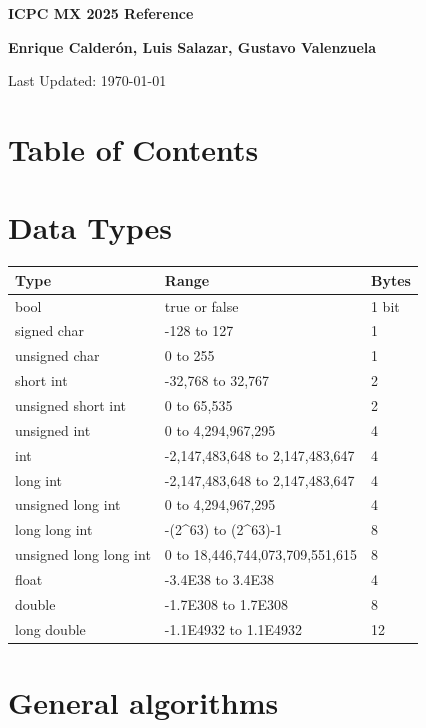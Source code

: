 \documentclass[10pt]{article}
\newcommand{\authorname}{\textbf{Enrique Calderón, Luis Salazar, Gustavo Valenzuela}}
\newcommand{\maketitlepage}{
    \begin{titlepage}
        \centering
        \vspace*{2cm}
        {\Huge\bfseries ICPC MX 2025 Reference\par}
        \vspace{1cm}
        {\Large \authorname \par}
        \vspace{2cm}
        {\large Last Updated: \today\par}
        \vfill
    \end{titlepage}
}
\begin{document}
\maketitlepage
\cleardoublepage

\section*{Table of Contents}
\begin{multicols*}{2}
    \startcontents[sections]
\end{multicols*}
\newpage

\begin{multicols*}{2}

\section{Data Types}
\begin{tabularx}{\linewidth}{|l|X|l|}
    \hline
    \textbf{Type} & \textbf{Range} & \textbf{Bytes} \\
    \hline
    bool & true or false & 1 bit \\
    \hline
    signed char & -128 to 127 & 1 \\
    \hline
    unsigned char & 0 to 255 & 1 \\
    \hline
    short int & -32,768 to 32,767 & 2 \\
    \hline
    unsigned short int & 0 to 65,535 & 2 \\
    \hline
    unsigned int & 0 to 4,294,967,295 & 4 \\
    \hline
    int & -2,147,483,648 to 2,147,483,647 & 4 \\
    \hline
    long int & -2,147,483,648 to 2,147,483,647 & 4 \\
    \hline
    unsigned long int & 0 to 4,294,967,295 & 4 \\
    \hline
    long long int & -(2\textasciicircum 63) to (2\textasciicircum 63)-1 & 8 \\
    \hline
    unsigned long long int & 0 to 18,446,744,073,709,551,615 & 8 \\
    \hline
    float & -3.4E38 to 3.4E38 & 4 \\
    \hline
    double & -1.7E308 to 1.7E308 & 8 \\
    \hline
    long double & -1.1E4932 to 1.1E4932 & 12 \\
    \hline
\end{tabularx}

\section{General algorithms}

\end{multicols*}
\end{document}
